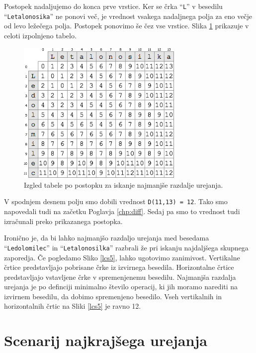 \documentclass[a4paper, 12pt, twoside]{book}
\begin{document}
Postopek nadaljujemo do konca prve vrstice. Ker se črka “{\tt L}” v besedilu “{\tt Letalonosika}” ne ponovi več, je vrednost vsakega nadaljnega polja za eno večje od levo ležečega polja. Postopek ponovimo še čez vse vrstice. Slika \ref{med4} prikazuje v celoti izpolnjeno tabelo.

\begin{figure}[placement h]
\begin{center}
\includegraphics[width=8cm]{med4.png}
\end{center}
\caption{Izgled tabele po postopku za iskanje najmanjše razdalje urejanja.}
\label{med4}
\end{figure}

V spodnjem desnem polju smo dobili vrednost {\tt D(11,13) = 12}. Tako smo napovedali tudi na začetku Poglavja \ref{chp:diff}. Sedaj pa smo to vrednost tudi izračunali preko prikazanega postopka.

Ironično je, da bi lahko najmanjšo razdaljo urejanja med besedama “{\tt Ledolomilec}” in “{\tt Letalonosilka}” razbrali že pri iskanju najdaljšega skupnega zaporedja. Če pogledamo Sliko \ref{lcs5}, lahko ugotovimo zanimivost. Vertikalne črtice predstavljajo pobrisane črke iz izvirnega besedila. Horizontalne črtice predstavljajo vstavljene črke v spremenjenemu besedilu. Najmanjša razdalja urejanja je po definciji minimalno število operacij, ki jih moramo narediti na izvirnem besedilu, da dobimo spremenjeno besedilo. Vseh vertikalnih in horizontalnih črtic na Sliki \ref{lcs5} je ravno 12.

\section{Scenarij najkrajšega urejanja}
\label{sec:ses}
\end{document}
